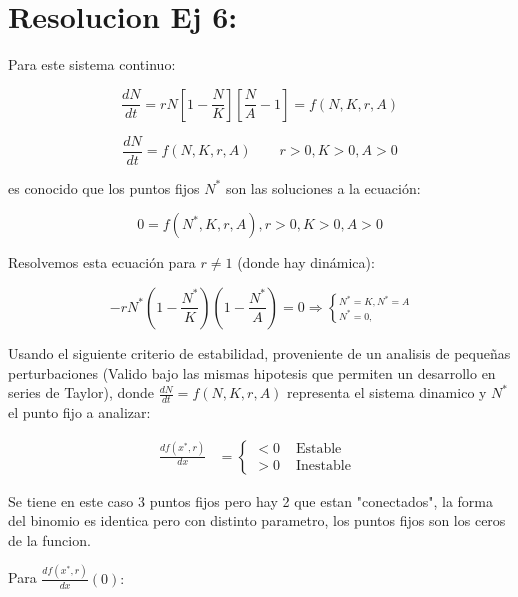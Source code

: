 \documentclass[twocolumn,aps,prl]{revtex4-1}
\newcommand{\Nstar}{N^*}
\begin{document}
% 
%                              
% 

\section{Resolucion Ej 6:}

Para este sistema continuo:

$$
\frac{d N}{d t} =r N\left[1-\frac{N}{K}\right]\left[\frac{N}{A}-1\right] = f(N, K, r, A)
$$

$$
\frac{d N}{d t} = f(N, K, r, A) \qquad r>0, K>0 , A>0
$$

es conocido que los puntos fijos $N^*$ son las soluciones a la ecuación:

\begin{equation}\label{eqn:etiqueta3}
    0 = f(N^*, K, r, A), r>0, K>0, A >0
\end{equation}

Resolvemos esta ecuación para $r\neq 1$ (donde hay dinámica):

\begin{equation}\label{eqn:etiqueta3}
    - r \Nstar  (1 - \frac{\Nstar}{K}) (1 - \frac{\Nstar}{A}) = 0 \Rightarrow \left\lbrace ^{\Nstar = K, \Nstar = A} _{\Nstar = 0, }  \right .
\end{equation}

Usando el siguiente criterio de estabilidad, proveniente de un analisis de pequeñas perturbaciones (Valido bajo las mismas hipotesis que permiten un desarrollo en series de Taylor), donde $\frac{dN}{dt} = f(N, K, r, A)$ representa el sistema dinamico y $\Nstar$ el punto fijo a analizar:

$$
\begin{aligned}
    \frac{d f\left(x^{*}, r\right)}{d x} &=\left\{ 
        \begin{array}{ll}
            <0 & \text { Estable } \\
            >0 & \text { Inestable }
        \end{array}\right.
\end{aligned}
$$

Se tiene en este caso 3 puntos fijos pero hay 2 que estan "conectados", la forma del binomio es identica pero con distinto parametro, los puntos fijos son los ceros de la funcion.

Para $\frac{d f\left(x^{*}, r\right)}{d x} (0):$ 
\end{document}
